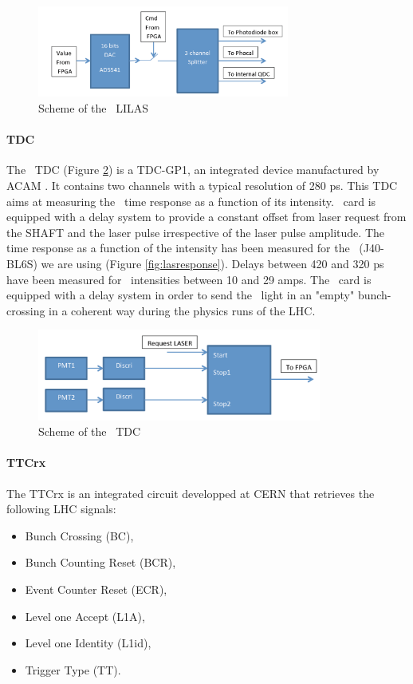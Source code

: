 \begin{figure}[htbp]

\centering
\includegraphics[height=3cm]{figures/lilas.pdf}
\caption{Scheme of the \lascar~LILAS}\label{fig:laslascarlilas}
\end{figure}

\paragraph{TDC}
The \lascar~TDC (Figure \ref{fig:laslascartdc}) is a TDC-GP1, an integrated device manufactured by ACAM \cite{ref:tdc}. It contains two channels with a typical resolution of 280 ps. This TDC aims at measuring the \las~time response as a function of its intensity. \lascar~card is equipped with a delay system to provide a constant offset from laser request from the SHAFT and the laser pulse irrespective of the laser pulse amplitude. The time response as a function of the intensity has been measured for the \las~(J40-BL6S) we are using (Figure \ref{fig:lasresponse}). Delays between 420 and 320 ps have been measured for \laser~intensities between 10 and 29 amps. The \lascar~card is equipped with a delay system in order to send the \las~light in an "empty" bunch-crossing in a coherent way during the physics runs of the LHC.

\begin{figure}[htbp]

\centering
\includegraphics[height=3cm]{figures/tdc.pdf}
\caption{Scheme of the \lascar~TDC}\label{fig:laslascartdc}
\end{figure}

\paragraph{TTCrx}

The TTCrx \cite{ref:ttcrx} is an integrated circuit developped at CERN that retrieves the following LHC signals:
\begin{itemize}
\item Bunch Crossing (BC),
\item Bunch Counting Reset (BCR),
\item Event Counter Reset (ECR),
\item Level one Accept (L1A),
\item Level one Identity (L1id),
\item Trigger Type (TT).
\end{itemize}

